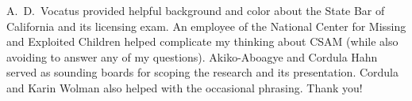 \documentclass[authorversion,nonacm,screen]{acmart}
\begin{document}
\begin{acks}
A.\ D.\ Vocatus provided helpful background and color about the State Bar of
California and its licensing exam. An employee of the National Center for
Missing and Exploited Children helped complicate my thinking about CSAM (while
also avoiding to answer any of my questions). Akiko-Aboagye and Cordula Hahn
served as sounding boards for scoping the research and its presentation. Cordula
and Karin Wolman also helped with the occasional phrasing. Thank you!
\end{acks}




\newpage
\appendix







\end{document}
